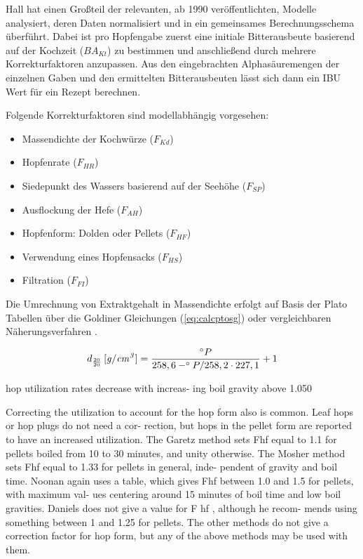 \documentclass[a4paper,parskip=half]{scrartcl}
\newcommand{\BAKt}{{\mathit{BA}}_{\mathit{Kt}}}
\newcommand{\uden}{\:[\mathit{g/cm^3}]}
\newcommand{\FKd}{F_{\mathit{Kd}}}
\newcommand{\FHR}{F_{\mathit{HR}}}
\newcommand{\FSP}{F_{\mathit{SP}}}
\newcommand{\FAH}{F_{\mathit{AH}}}
\newcommand{\FHF}{F_{\mathit{HF}}}
\newcommand{\FHS}{F_{\mathit{HS}}}
\newcommand{\FFil}{F_{\mathit{FI}}}
\begin{document}
Hall hat einen Großteil der relevanten, ab 1990 veröffentlichten, Modelle analysiert,
deren Daten normalisiert und in ein gemeinsames Berechnungsschema überführt. Dabei ist
pro Hopfengabe zuerst eine initiale Bitterausbeute basierend auf der Kochzeit
($\BAKt$) zu bestimmen und anschließend durch mehrere Korrekturfaktoren anzupassen.
Aus den eingebrachten Alphasäuremengen der einzelnen Gaben und den ermittelten
Bitterausbeuten lässt sich dann ein IBU Wert für ein Rezept berechnen. \parencite[59-65]{Hall1997}


Folgende Korrekturfaktoren sind modellabhängig vorgesehen:

\begin{itemize}
\item Massendichte der Kochwürze ($\FKd$)
\item Hopfenrate ($\FHR$)
\item Siedepunkt des Wassers basierend auf der Seehöhe ($\FSP$)
\item Ausflockung der Hefe ($\FAH$)
\item Hopfenform: Dolden oder Pellets ($\FHF$)
\item Verwendung eines Hopfensacks ($\FHS$)
\item Filtration ($\FFil$)
\end{itemize}

Die Umrechnung von Extraktgehalt in Massendichte erfolgt auf Basis
der Plato Tabellen über die Goldiner Gleichungen (\autoref{eq:calcptosg})
oder vergleichbaren Näherungsverfahren \parencite[140\psq]{Spedding2016}.

\begin{equation}
d_{\frac{20}{20}} \uden = \frac{\degree P}{258,6 - \degree P / 258,2 \cdot 227,1} + 1
\label{eq:calcptosg}
\end{equation}

\parencite[62]{Hall1997}
hop utilization rates decrease with increas-
ing boil gravity above 1.050

Correcting the utilization to
account for the hop form also is common.
Leaf hops or hop plugs do not need a cor-
rection, but hops in the pellet form are
reported to have an increased utilization.
The Garetz method sets Fhf equal to 1.1 for
pellets boiled from 10 to 30 minutes, and
unity otherwise. The Mosher method sets
Fhf equal to 1.33 for pellets in general, inde-
pendent of gravity and boil time. Noonan
again uses a table, which gives Fhf between
1.0 and 1.5 for pellets, with maximum val-
ues centering around 15 minutes of boil
time and low boil gravities. Daniels does not
give a value for F hf , although he recom-
mends using something between 1 and 1.25
for pellets. The other methods do not give
a correction factor for hop form, but any of
the above methods may be used with them.
\end{document}
